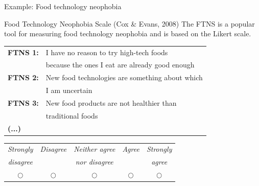 \documentclass{beamer}
\begin{document}
\begin{frame}{Example: Food technology neophobia}
  \begin{block}{Food Technology Neophobia Scale (Cox \& Evans, 2008)}
    The FTNS is a popular tool for measuring food technology neophobia and is based on the Likert scale.
  \end{block}
  \vspace{0.3cm}
  \small
  \begin{tabular}{l l}
    \textbf{FTNS 1:} & I have no reason to try high-tech foods \\
    & because the ones I eat are already good enough \\
    \textbf{FTNS 2:} & New food technologies are something about which \\
    & I am uncertain \\
    \textbf{FTNS 3:} & New food products are not healthier than \\ 
    & traditional foods \\
    \textbf{(...)}
  \end{tabular}
  \vspace{0.2cm}
  \begin{center}
    \footnotesize
    \begin{tabular}{ccccc}
      \toprule
      \textit{Strongly} & \textit{Disagree} & \textit{Neither agree} & \textit{Agree} & \textit{Strongly} \\
      \textit{disagree} &  & \textit{nor disagree} &  & \textit{agree} \\
      \midrule
      $\bigcirc$ & $\bigcirc$ & $\bigcirc$ & $\bigcirc$ & $\bigcirc$ \\
      \bottomrule
    \end{tabular}
  \end{center}
\end{frame}
\end{document}
